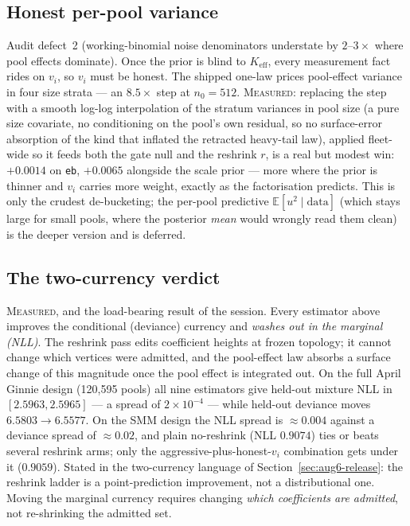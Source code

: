 \subsection{Honest per-pool variance}\label{sec:aug12-vi}

Audit defect~2 (working-binomial noise denominators understate by $2$--$3\times$
where pool effects dominate). Once the prior is blind to $K_{\mathrm{eff}}$,
every measurement fact rides on $v_i$, so $v_i$ must be honest. The shipped
one-law prices pool-effect variance in four size strata --- an $8.5\times$ step
at $n_0=512$. \textsc{Measured}: replacing the step with a smooth log-log
interpolation of the stratum variances in pool size (a pure size covariate, no
conditioning on the pool's own residual, so no surface-error absorption of the
kind that inflated the retracted heavy-tail law), applied fleet-wide so it
feeds both the gate null and the reshrink $r$, is a real but modest win:
$+0.0014$ on \texttt{eb}, $+0.0065$ alongside the scale prior --- more where
the prior is thinner and $v_i$ carries more weight, exactly as the
factorisation predicts. This is only the crudest de-bucketing; the per-pool
predictive $\mathbb E[u^2\mid\text{data}]$ (which stays large for small pools,
where the posterior \emph{mean} would wrongly read them clean) is the deeper
version and is deferred.

\subsection{The two-currency verdict}\label{sec:aug12-currency}

\textsc{Measured}, and the load-bearing result of the session. Every estimator
above improves the conditional (deviance) currency and \emph{washes out in the
marginal (NLL)}. The reshrink pass edits coefficient heights at frozen
topology; it cannot change which vertices were admitted, and the pool-effect
law absorbs a surface change of this magnitude once the pool effect is
integrated out. On the full April Ginnie design (120{,}595 pools) all nine
estimators give held-out mixture NLL in $[2.5963,2.5965]$ --- a spread of
$2\times10^{-4}$ --- while held-out deviance moves $6.5803\to6.5577$. On the
SMM design the NLL spread is $\approx0.004$ against a deviance spread of
$\approx0.02$, and plain no-reshrink (NLL $0.9074$) ties or beats several
reshrink arms; only the aggressive-plus-honest-$v_i$ combination gets under it
($0.9059$). Stated in the two-currency language of
Section~\ref{sec:aug6-release}: the reshrink ladder is a point-prediction
improvement, not a distributional one. Moving the marginal currency requires
changing \emph{which coefficients are admitted}, not re-shrinking the admitted
set.

